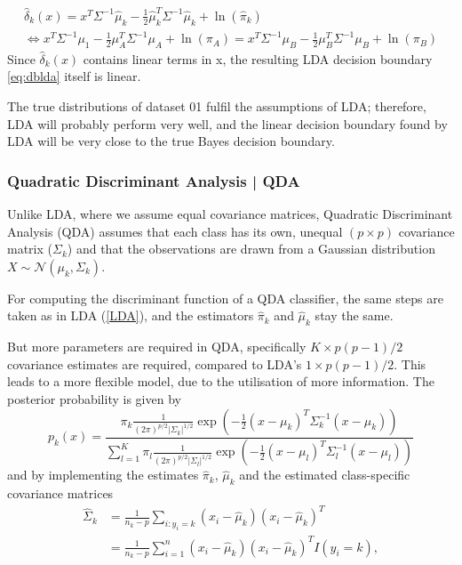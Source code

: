 \documentclass[12pt,a4paper,titlepage]{article}
\numberwithin{equation}{section}
\numberwithin{table}{section}
\numberwithin{figure}{section}
\begin{document}
        \begin{align}
        \hat\delta_k(x)=x^T \Sigma^{-1}\hat\mu_k - \frac{1}{2}\hat\mu_k^T\Sigma^{-1}\hat\mu_k + \ln(\hat\pi_k) \label{eq:dflda} \\
        \Leftrightarrow x^T \Sigma^{-1}\mu_1 - \frac{1}{2}\mu_A^T\Sigma^{-1}\mu_A + \ln(\pi_A) = x^T \Sigma^{-1}\mu_B - \frac{1}{2}\mu_B^T\Sigma^{-1}\mu_B + \ln(\pi_B) \label{eq:dblda}
        \end{align}
        Since $\hat\delta_k(x)$ contains linear terms in x, the resulting LDA decision boundary \ref{eq:dblda} itself is linear.
        
        \noindent The true distributions of dataset 01 fulfil the assumptions of LDA; therefore, LDA will probably perform very well, and the linear decision boundary found by LDA will be very close to the true Bayes decision boundary.
    
        \subsubsection{Quadratic Discriminant Analysis | QDA}\label{QDA}
        Unlike LDA, where we assume equal covariance matrices, Quadratic Discriminant Analysis (QDA) assumes that each class has its own, unequal $(p\times p)$ covariance matrix ($\Sigma_k$) and that the observations are drawn from a Gaussian distribution
        $X \sim \mathcal{N}(\mu_k,\Sigma_k)$.
        
        For computing the discriminant function of a QDA classifier, the same steps are taken as in LDA (\ref{LDA}), and the estimators $\hat\pi_k$ and $\hat\mu_k$ stay the same.
        
        \noindent But more parameters are required in QDA, specifically ${K}\times p(p-1)/2$ covariance estimates are required, compared to LDA's $1\times p(p-1)/2$. This leads to a more flexible model, due to the utilisation of more information. The posterior probability is given by
        \begin{equation}
        \label{eq:qda}
        p_k(x) =\frac{\pi_k \frac{1}{(2\pi)^{p/2}|\Sigma_k|^{1/2}}\exp\left(-\frac{1}{2}(x-\mu_k)^T\Sigma_k^{-1}(x-\mu_k)\right)}{\sum_{l=1}^K\pi_l \frac{1}{(2\pi)^{p/2}|\Sigma_l|^{1/2}}\exp\left(-\frac{1}{2}(x-\mu_l)^T\Sigma_l^{-1}(x-\mu_l)\right)}
        \end{equation} and by implementing the estimates $\hat\pi_k$, $\hat\mu_k$ and the estimated class-specific covariance matrices
        \begin{align}
        \hat{\Sigma}_k & = \frac{1}{n_k-p}\sum_{i:y_i=k}(x_i-\hat\mu_k)(x_i-\hat\mu_k)^T \nonumber\\
        & = \frac{1}{n_k-p}\sum_{i=1}^n(x_i-\hat\mu_k)(x_i-\hat\mu_k)^T I(y_i=k),
        \end{align}
        
\end{document}
